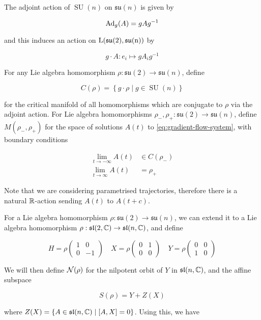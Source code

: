 \documentclass{report}
\DeclareMathOperator{\SU}{SU}
\newcommand{\su}{\mathfrak{su}}
\renewcommand{\sl}{\mathfrak{sl}}
\begin{document}
The adjoint action of \(\SU(n)\) on \(\su(n)\) is given by

\[\operatorname{Ad}_g(A) = gAg^{-1}\]

and this induces an action on \(\rm L(\su(2), \su(n))\) by

\[g \cdot A : e_i \mapsto gA_ig^{-1}\]

For any Lie algebra homomorphism \(\rho : \su(2) \to \su(n)\), define

\[C(\rho) = \left\{g \cdot \rho \mid g \in \SU(n)\right\}\]

for the critical manifold of all homomorphisms which are conjugate to \(\rho\) via the adjoint action. For Lie algebra homomorphisms \(\rho_-, \rho_+ : \su(2) \to \su(n)\), define \(M(\rho_-, \rho_+)\) for the space of solutions \(A(t)\) to \cref{eq:gradient-flow-system}, with boundary conditions

\begin{equation}
    \label{eq:boundary-conditions}
    \begin{split}
        \lim_{t\to-\infty}A(t) &\in C(\rho_-) \\
        \lim_{t\to\infty}A(t) &= \rho_+
    \end{split}
\end{equation}

Note that we are considering parametrised trajectories, therefore there is a natural \(\mathbb{R}\)-action sending \(A(t)\) to \(A(t+c)\).

For a Lie algebra homomorphism \(\rho : \su(2) \to \su(n)\), we can extend it to a Lie algebra homomorphism \(\rho : \sl(2, \C) \to \sl(n, \C)\), and define

\[H = \rho\begin{pmatrix}
    1 & 0 \\
    0 & -1
\end{pmatrix}\quad X = \rho\begin{pmatrix}
    0 & 1 \\
    0 & 0
\end{pmatrix} \quad Y = \rho\begin{pmatrix}
    0 & 0 \\
    1 & 0
\end{pmatrix}\]

We will then define \(\mathcal{N}(\rho)\) for the nilpotent orbit of \(Y\) in \(\sl(n, \C)\), and the affine subspace

\[S(\rho) = Y + Z(X)\]

where \(Z(X) = \left\{A \in \sl(n, \C) \mid [A, X] = 0\right\}\). Using this, we have
\end{document}
